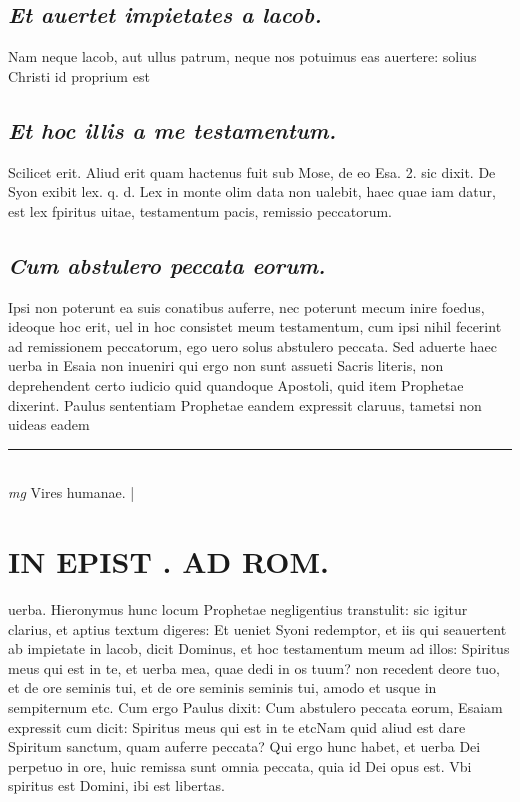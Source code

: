 \documentclass{article}
\begin{document}
\begin{pages}
\subsection*{\textit{Et auertet impietates a lacob. }}\pstart Nam neque lacob, aut ullus patrum, neque nos potuimus eas auertere: solius Christi id proprium est\pend
{}
{}
\subsection*{\textit{Et hoc illis a me testamentum. }}\pstart Scilicet erit. Aliud erit quam hactenus fuit sub Mose, de eo Esa. 2. sic dixit. De Syon exibit lex. q. d.  Lex in monte olim data non ualebit, haec quae iam datur, est lex fpiritus uitae, testamentum pacis, remissio peccatorum.   \pend
{}
{}
\subsection*{\textit{Cum abstulero peccata eorum. }}\pstart Ipsi non poterunt ea suis conatibus auferre, nec poterunt mecum inire foedus, ideoque hoc erit, uel in hoc consistet meum testamentum, cum ipsi nihil fecerint ad remissionem peccatorum, ego uero solus abstulero peccata. Sed aduerte haec uerba in Esaia non inueniri qui ergo non sunt assueti Sacris literis, non deprehendent certo iudicio quid quandoque Apostoli, quid item Prophetae dixerint. Paulus sententiam Prophetae eandem expressit claruus, tametsi non uideas eadem  \pend
\vspace{0.5cm}\noindent
\vspace{0.2cm}\rule{1cm}{0.2pt}\\ 
\hspace{0.2cm}\textit{mg}
\footnotesize Vires humanae. 
\normalsize| 
\section*{IN EPIST . AD ROM.  }
\marginpar{[ p.134 ]}\pstart uerba. Hieronymus hunc locum Prophetae negligentius transtulit: sic igitur clarius, et aptius textum digeres: Et ueniet Syoni redemptor, et iis qui seauertent ab impietate in lacob, dicit Dominus, et hoc testamentum meum ad illos: Spiritus meus qui est in te, et uerba mea, quae dedi in os tuum? non recedent deore tuo, et de ore seminis tui, et de ore seminis seminis tui, amodo et usque in sempiternum etc. Cum ergo Paulus dixit: Cum abstulero peccata eorum, Esaiam expressit cum dicit: Spiritus meus qui est in te etcNam quid aliud est dare Spiritum sanctum, quam auferre peccata? Qui ergo hunc habet, et uerba Dei perpetuo in ore, huic remissa sunt omnia peccata, quia id Dei opus est. Vbi spiritus est Domini, ibi est libertas.   \pend
{}
{}

\end{pages}
\end{document}

